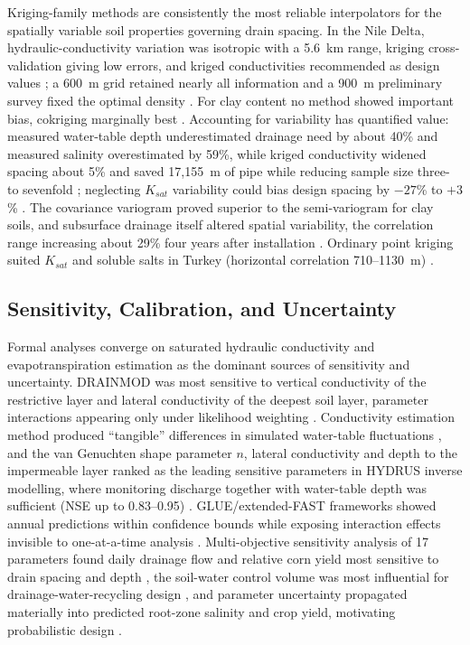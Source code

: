 \documentclass[11pt]{article}
\begin{document}
Kriging-family methods are consistently the most reliable interpolators for the spatially variable soil properties governing drain spacing. In the Nile Delta, hydraulic-conductivity variation was isotropic with a 5.6~km range, kriging cross-validation giving low errors, and kriged conductivities recommended as design values \parencite{GALLICHAND1991}; a 600~m grid retained nearly all information and a 900~m preliminary survey fixed the optimal density \parencite{GALLICHAND1992}. For clay content no method showed important bias, cokriging marginally best \parencite{GALLICHAND1993}. Accounting for variability has quantified value: measured water-table depth underestimated drainage need by about 40\% and measured salinity overestimated by 59\%, while kriged conductivity widened spacing about 5\% and saved 17{,}155~m of pipe while reducing sample size three- to sevenfold \parencite{Moustafa1998b}; neglecting $K_{sat}$ variability could bias design spacing by $-27$\% to $+3$\% \parencite{Moustafa2000}. The covariance variogram proved superior to the semi-variogram for clay soils, and subsurface drainage itself altered spatial variability, the correlation range increasing about 29\% four years after installation \parencite{Moustafa1998}. Ordinary point kriging suited $K_{sat}$ and soluble salts in Turkey (horizontal correlation 710--1130~m) \parencite{Akis2015,Sepaskhah2004}.

\subsection{Sensitivity, Calibration, and Uncertainty}

Formal analyses converge on saturated hydraulic conductivity and evapotranspiration estimation as the dominant sources of sensitivity and uncertainty. \textsc{DRAINMOD} was most sensitive to vertical conductivity of the restrictive layer and lateral conductivity of the deepest soil layer, parameter interactions appearing only under likelihood weighting \parencite{Wang2006}. Conductivity estimation method produced ``tangible'' differences in simulated water-table fluctuations \parencite{NabiSichani2012}, and the van Genuchten shape parameter $n$, lateral conductivity and depth to the impermeable layer ranked as the leading sensitive parameters in HYDRUS inverse modelling, where monitoring discharge together with water-table depth was sufficient (NSE up to 0.83--0.95) \parencite{Sedaghatdoost2018}. GLUE/extended-FAST frameworks showed annual predictions within confidence bounds while exposing interaction effects invisible to one-at-a-time analysis \parencite{Wang2006}. Multi-objective sensitivity analysis of 17 parameters found daily drainage flow and relative corn yield most sensitive to drain spacing and depth \parencite{Timalsina2023}, the soil-water control volume was most influential for drainage-water-recycling design \parencite{Reinhart2020}, and parameter uncertainty propagated materially into predicted root-zone salinity and crop yield, motivating probabilistic design \parencite{Alzraiee2013,Alzraiee2013b}.
\end{document}
